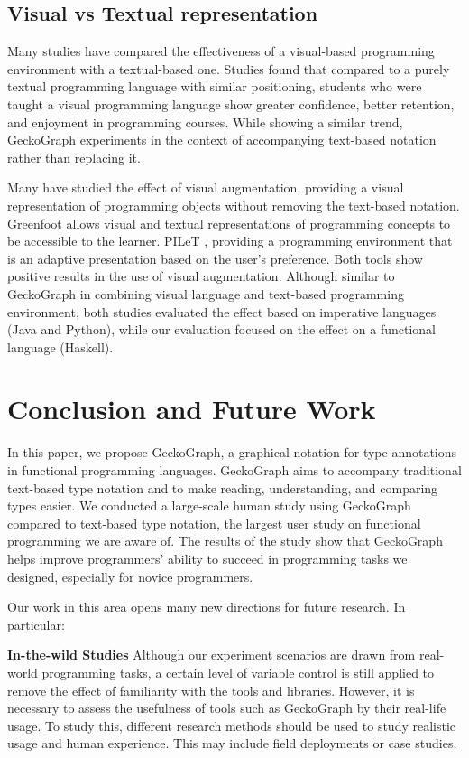 \subsection{Visual vs Textual representation}

Many studies have compared the effectiveness of a visual-based programming environment with a textual-based one. Studies \cite{Noone2018-wl, Da_Silva_Ribeiro2014-tm, Cliburn2008-jo, Daly2011-is} found that compared to a purely textual programming language with similar positioning, students who were taught a visual programming language show greater confidence, better retention, and enjoyment in programming courses. While showing a similar trend, GeckoGraph experiments in the context of accompanying text-based notation rather than replacing it. 


Many have studied the effect of visual augmentation, providing a visual representation of programming objects without removing the text-based notation. Greenfoot \cite{Montero2010-uh} allows visual and textual representations of programming concepts to be accessible to the learner. PILeT \cite{Alshaigy2015-wy}, providing a programming environment that is an adaptive presentation based on the user's preference. Both tools show positive results in the use of visual augmentation. Although similar to GeckoGraph in combining visual language and text-based programming environment, both studies evaluated the effect based on imperative languages (Java and Python), while our evaluation focused on the effect on a functional language (Haskell).

\section{Conclusion and Future Work}
In this paper, we propose GeckoGraph, a graphical notation for type annotations in functional programming languages. GeckoGraph aims to accompany traditional text-based type notation and to make reading, understanding, and comparing types easier. We conducted a large-scale human study using GeckoGraph compared to text-based type notation, the largest user study on functional programming we are aware of. The results of the study show that GeckoGraph helps improve programmers' ability to succeed in programming tasks we designed, especially for novice programmers.

Our work in this area opens many new directions for future research.  In particular:

\noindent\textbf{In-the-wild Studies}
Although our experiment scenarios are drawn from real-world programming tasks, a certain level of variable control is still applied to remove the effect of familiarity with the tools and libraries. However, it is necessary to assess the usefulness of tools such as GeckoGraph by their real-life usage. To study this, different research methods should be used to study realistic usage and human experience. This may include field deployments or case studies. 

